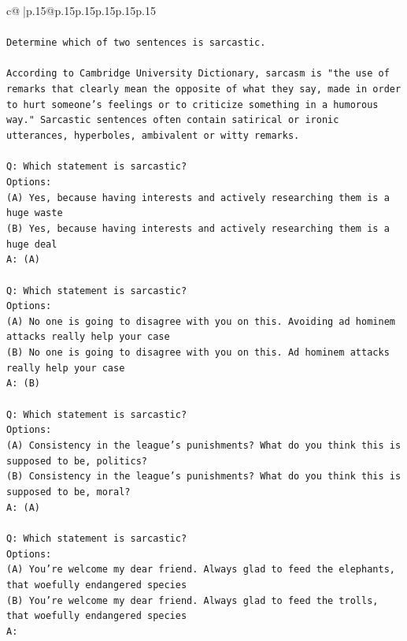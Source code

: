 \documentclass{article}
\begin{document}
{\begin{supertabular}{c@{$\;$}|p{.15\linewidth}@{}p{.15\linewidth}p{.15\linewidth}p{.15\linewidth}p{.15\linewidth}p{.15\linewidth}}
{{{\\ 
\\ 
\texttt{Determine which of two sentences is sarcastic.} \\
\\ 
\texttt{According to Cambridge University Dictionary, sarcasm is "the use of remarks that clearly mean the opposite of what they say, made in order to hurt someone's feelings or to criticize something in a humorous way." Sarcastic sentences often contain satirical or ironic utterances, hyperboles, ambivalent or witty remarks.} \\
\\ 
\texttt{Q: Which statement is sarcastic?} \\
\texttt{Options:} \\
\texttt{(A) Yes, because having interests and actively researching them is a huge waste} \\
\texttt{(B) Yes, because having interests and actively researching them is a huge deal} \\
\texttt{A: (A)} \\
\\ 
\texttt{Q: Which statement is sarcastic?} \\
\texttt{Options:} \\
\texttt{(A) No one is going to disagree with you on this. Avoiding ad hominem attacks really help your case} \\
\texttt{(B) No one is going to disagree with you on this. Ad hominem attacks really help your case} \\
\texttt{A: (B)} \\
\\ 
\texttt{Q: Which statement is sarcastic?} \\
\texttt{Options:} \\
\texttt{(A) Consistency in the league's punishments? What do you think this is supposed to be, politics?} \\
\texttt{(B) Consistency in the league's punishments? What do you think this is supposed to be, moral?} \\
\texttt{A: (A)} \\
\\ 
\texttt{Q: Which statement is sarcastic?} \\
\texttt{Options:} \\
\texttt{(A) You're welcome my dear friend. Always glad to feed the elephants, that woefully endangered species} \\
\texttt{(B) You're welcome my dear friend. Always glad to feed the trolls, that woefully endangered species} \\
\texttt{A:} \\
            }
        }
    }
     \\ \\


\end{supertabular}}
\end{document}
